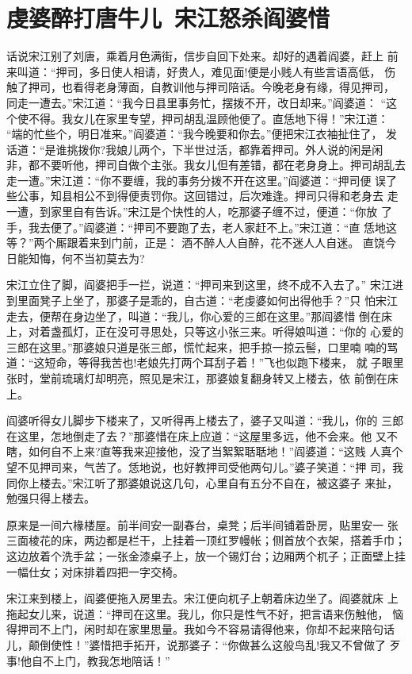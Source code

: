 \chapter{虔婆醉打唐牛儿~宋江怒杀阎婆惜}

话说宋江别了刘唐，乘着月色满街，信步自回下处来。却好的遇着阎婆，赶上
前来叫道：“押司，多日使人相请，好贵人，难见面!便是小贱人有些言语高低，
伤触了押司，也看得老身薄面，自教训他与押司陪话。今晚老身有缘，得见押司，
同走一遭去。”宋江道：“我今日县里事务忙，摆拨不开，改日却来。”阎婆道：
“这个使不得。我女儿在家里专望，押司胡乱温顾他便了。直恁地下得！”宋江道：
“端的忙些个，明日准来。”阎婆道：“我今晚要和你去。”便把宋江衣袖扯住了，
发话道：“是谁挑拨你?我娘儿两个，下半世过活，都靠着押司。外人说的闲是闲
非，都不要听他，押司自做个主张。我女儿但有差错，都在老身身上。押司胡乱去
走一遭。”宋江道：“你不要缠，我的事务分拨不开在这里。”阎婆道：“押司便
误了些公事，知县相公不到得便责罚你。这回错过，后次难逢。押司只得和老身去
走一遭，到家里自有告诉。”宋江是个快性的人，吃那婆子缠不过，便道：“你放
了手，我去便了。”阎婆道：“押司不要跑了去，老人家赶不上。”宋江道：“直
恁地这等？”两个厮跟着来到门前，正是：
酒不醉人人自醉，花不迷人人自迷。
直饶今日能知悔，何不当初莫去为?

宋江立住了脚，阎婆把手一拦，说道：“押司来到这里，终不成不入去了。”
宋江进到里面凳子上坐了，那婆子是乖的，自古道：“老虔婆如何出得他手？”只
怕宋江走去，便帮在身边坐了，叫道：“我儿，你心爱的三郎在这里。”那阎婆惜
倒在床上，对着盏孤灯，正在没可寻思处，只等这小张三来。听得娘叫道：“你的
心爱的三郎在这里。”那婆娘只道是张三郎，慌忙起来，把手掠一掠云髻，口里喃
喃的骂道：“这短命，等得我苦也!老娘先打两个耳刮子着！”飞也似跑下楼来，
就子眼里张时，堂前琉璃灯却明亮，照见是宋江，那婆娘复翻身转又上楼去，依
前倒在床上。

阎婆听得女儿脚步下楼来了，又听得再上楼去了，婆子又叫道：“我儿，你的
三郎在这里，怎地倒走了去？”那婆惜在床上应道：“这屋里多远，他不会来。他
又不瞎，如何自不上来?直等我来迎接他，没了当絮絮聒聒地！”阎婆道：“这贱
人真个望不见押司来，气苦了。恁地说，也好教押司受他两句儿。”婆子笑道：“押
司，我同你上楼去。”宋江听了那婆娘说这几句，心里自有五分不自在，被这婆子
来扯，勉强只得上楼去。

原来是一间六椽楼屋。前半间安一副春台，桌凳；后半间铺着卧房，贴里安一
张三面棱花的床，两边都是栏干，上挂着一顶红罗幔帐；侧首放个衣架，搭着手巾；
这边放着个洗手盆；一张金漆桌子上，放一个锡灯台；边厢两个杌子；正面壁上挂
一幅仕女；对床排着四把一字交椅。

宋江来到楼上，阎婆便拖入房里去。宋江便向杌子上朝着床边坐了。阎婆就床
上拖起女儿来，说道：“押司在这里。我儿，你只是性气不好，把言语来伤触他，
恼得押司不上门，闲时却在家里思量。我如今不容易请得他来，你却不起来陪句话
儿，颠倒使性！”婆惜把手拓开，说那婆子：“你做甚么这般鸟乱!我又不曾做了
歹事!他自不上门，教我怎地陪话！”

